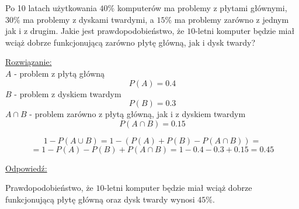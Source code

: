 \medskip 
{}  
\medskip

Po 10 latach użytkowania $40\%$ komputerów ma problemy z płytami głównymi,
$30\%$ ma problemy z dyskami twardymi, a $15\%$ ma problemy zarówno z jednym
jak i z drugim. Jakie jest prawdopodobieństwo, że $10$-letni komputer będzie
miał wciąż dobrze funkcjonującą zarówno płytę główną, jak i dysk twardy?

\underline{Rozwiązanie:}
$$
$$
$A$ - problem z płytą główną
$$
P(A)=0.4
$$
$B$ - problem z dyskiem twardym
$$
P(B)=0.3
$$
$A \cap B$ - problem zarówno z płytą główną, jak i z dyskiem twardym
$$
P( A \cap B ) = 0.15
$$

$$
1 - P( A \cup B ) = 1 - ( P(A) + P(B) - P( A \cap B ) ) = 
$$
$$
= 1 - P(A) - P(B) + P( A \cap B ) = 1 - 0.4 - 0.3 + 0.15 = 0.45
$$

\underline{Odpowiedź:}

Prawdopodobieństwo, że $10$-letni komputer będzie miał wciąż dobrze funkcjonującą
płytę główną oraz dysk twardy wynosi $45\%$.
